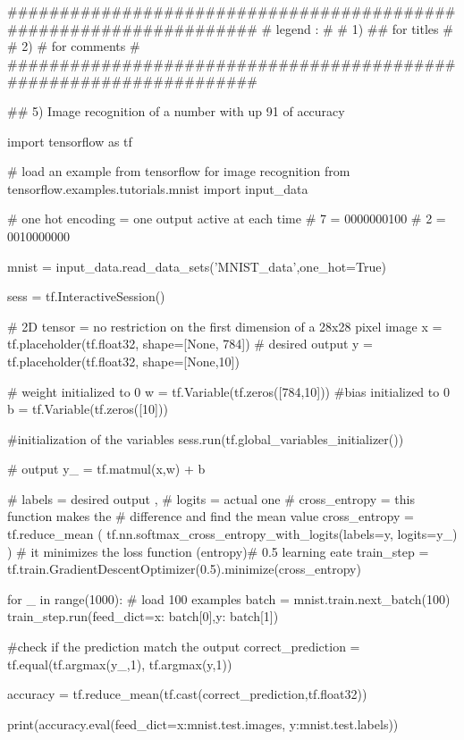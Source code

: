 \documentclass[11pt]{article}
\begin{document}
\begin{python}

###################################################################
# legend :                                                        #
#         1) ## for titles                                        #
#         2) #  for comments                                      #
###################################################################   

## 5) Image recognition of a number with up 91 of accuracy

import tensorflow as tf

# load an example from tensorflow for image recognition
from tensorflow.examples.tutorials.mnist import input_data


# one hot encoding =  one output active at each time
# 7 = 0000000100
# 2 = 0010000000

mnist = input_data.read_data_sets('MNIST_data',one_hot=True)


sess = tf.InteractiveSession()

# 2D tensor = no restriction on the first dimension of a 28x28 pixel image
x = tf.placeholder(tf.float32, shape=[None, 784])
# desired output
y = tf.placeholder(tf.float32, shape=[None,10])

# weight initialized to 0
w = tf.Variable(tf.zeros([784,10]))
#bias initialized to 0
b = tf.Variable(tf.zeros([10]))

#initialization of the variables
sess.run(tf.global_variables_initializer())

# output
y_ = tf.matmul(x,w) + b

# labels = desired output , # logits = actual one
# cross_entropy = this function makes the 
# difference and find the mean value
cross_entropy = tf.reduce_mean (
  tf.nn.softmax_cross_entropy_with_logits(labels=y, logits=y_)
)
# it minimizes the loss function (entropy)#  0.5  learning eate
train_step = tf.train.GradientDescentOptimizer(0.5).minimize(cross_entropy)

for _ in range(1000):
# load 100 examples
   batch = mnist.train.next_batch(100)
   train_step.run(feed_dict={x: batch[0],y: batch[1]})

#check if the prediction match the output
correct_prediction = tf.equal(tf.argmax(y_,1), tf.argmax(y,1))

accuracy = tf.reduce_mean(tf.cast(correct_prediction,tf.float32))

print(accuracy.eval(feed_dict={x:mnist.test.images, y:mnist.test.labels}))
\end{python}{}
\clearpage
\end{document}
